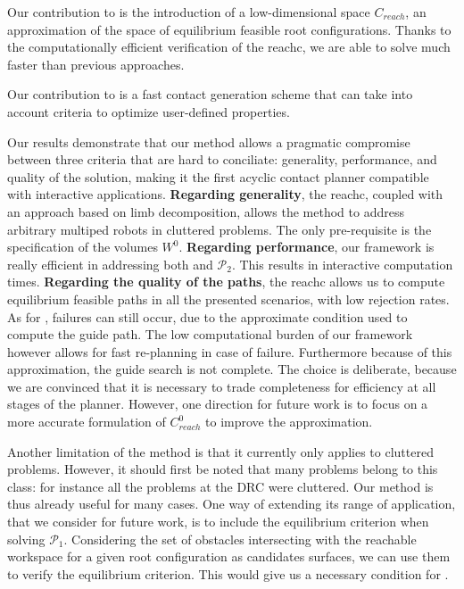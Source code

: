 Our contribution to \Pa is the introduction of a low-dimensional space $C_{reach}$, an approximation of the space of \gls{equilibrium feasible} root configurations.
Thanks to the computationally efficient verification of the \gls{reachc}, we are able to solve \Pa much faster than previous approaches.

Our contribution to \Pb is a fast contact generation scheme that can take into
account criteria to optimize user-defined properties.

Our results demonstrate that our method allows a pragmatic compromise between three 
criteria that are hard to conciliate: generality, performance, and quality of the solution, making it the first acyclic contact
planner compatible with \gls{interactive} applications.
%
\textbf{Regarding generality}, the \gls{reachc}, coupled with an approach based on limb decomposition, 
allows the method to address arbitrary multiped robots in \gls{cluttered} problems. The only pre-requisite is the specification 
of the volumes $W^0$.
%
\textbf{Regarding performance}, our framework is really efficient in addressing both \Pa and $\mathcal{P}_2$. This results in \gls{interactive} computation times.
%
\textbf{Regarding the quality of the paths}, the \gls{reachc} allows us to compute
\gls{equilibrium feasible} paths in all the presented scenarios, with low rejection rates.
As for \cite{Bouyarmane2009}, failures can still occur, due to the approximate condition used to compute the guide path.
The low computational burden of our framework however allows for fast re-planning in case of failure.
Furthermore because of this approximation, the guide search is not complete. The choice is deliberate, because we are convinced
that it is necessary to trade completeness for efficiency at all stages of the planner.
However, one direction for future work is to focus on a more accurate formulation of $C_{reach}^0$ to improve
the approximation.

Another limitation of the method is that it currently only applies to \gls{cluttered} problems.
However, it should first be noted that many problems belong to this class: for instance all the problems
at the DRC were \gls{cluttered}. Our method is thus already useful for many cases.
One way of extending its range of application, that we 
consider for future work, is to include the equilibrium criterion when solving $\mathcal{P}_1$.
Considering the set of obstacles intersecting with the reachable workspace for a given root configuration as candidates surfaces, we can use them to verify the equilibrium criterion.
This would give us a necessary condition for \equilibriumfeasibility.


